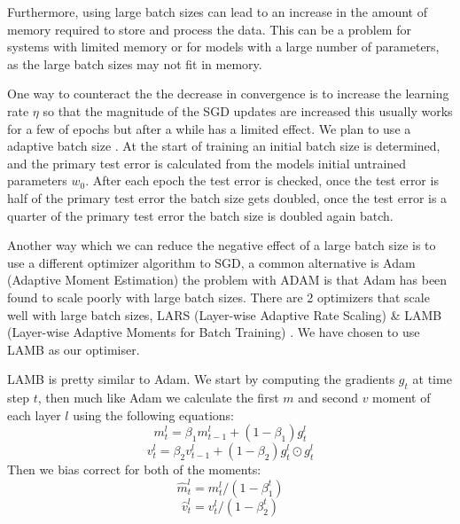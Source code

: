 \documentclass[11pt]{article}
\begin{document}
Furthermore, using large batch sizes can lead to an increase in the amount of memory required to store and process the data. This can be a problem for systems with limited memory or for models with a large number of parameters, as the large batch sizes may not fit in memory.

One way to counteract the the decrease in convergence is to increase the learning rate $\eta$ \cite{goyal2017accurate} so that the magnitude of the SGD updates are increased this usually works for a few of epochs but after a while has a limited effect. We plan to use a adaptive batch size \cite{devarakonda2017adabatch}. At the start of training an initial batch size is determined, and the primary test error is calculated from the models initial untrained parameters $w_0$. After each epoch the test error is checked, once the test error is half of the primary test error the batch size gets doubled, once the test error is a quarter of the primary test error the batch size is doubled again batch.

Another way which we can reduce the negative effect of a large batch size is to use a different optimizer algorithm to SGD, a common alternative is Adam (Adaptive Moment Estimation) \cite{kingma2014adam} the problem with ADAM is that Adam has been found to scale poorly with large batch sizes. There are 2 optimizers that scale well with large batch sizes, LARS (Layer-wise Adaptive Rate Scaling) \cite{you2017scaling} \& LAMB (Layer-wise Adaptive Moments for Batch Training) \cite{you2019large}. We have chosen to use LAMB as our optimiser. 

LAMB is pretty similar to Adam. We start by computing the gradients $g_t$ at time step $t$, then much like Adam we calculate the first $m$ and second $v$ moment of each layer $l$ using the following equations:
\begin{equation*} \label{1mom}
m^l_t = \beta _1 m^l_{t-1} + (1-\beta _1) g^l_t
\end{equation*}
\begin{equation*} \label{2mom}
v^l_t = \beta _2 v^l_{t-1} + (1-\beta _2) g^l_t \odot g^l_t
\end{equation*}
Then we bias correct for both of the moments:
\begin{equation*} \label{b1}
\hat{m}^l_t = m^l_t /(1-\beta ^t_1)
\end{equation*}
\begin{equation*} \label{b2}
\hat{v}^l_t = v^l_t /(1-\beta ^t_2)
\end{equation*}
\end{document}
